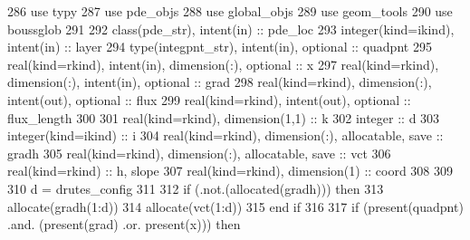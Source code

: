 \begin{DoxyCode}
286         \textcolor{keywordtype}{use }typy
287         \textcolor{keywordtype}{use }pde_objs
288         \textcolor{keywordtype}{use }global_objs
289         \textcolor{keywordtype}{use }geom_tools
290         \textcolor{keywordtype}{use }boussglob
291         
292         \textcolor{keywordtype}{class}(pde_str), \textcolor{keywordtype}{intent(in)} :: pde\_loc
293         \textcolor{keywordtype}{integer(kind=ikind)}, \textcolor{keywordtype}{intent(in)}                          :: layer
294         \textcolor{keywordtype}{type}(integpnt_str), \textcolor{keywordtype}{intent(in)}, \textcolor{keywordtype}{optional} :: quadpnt    
295         \textcolor{keywordtype}{real(kind=rkind)}, \textcolor{keywordtype}{intent(in)}, \textcolor{keywordtype}{dimension(:)}, \textcolor{keywordtype}{optional}                   :: x
297         \textcolor{keywordtype}{real(kind=rkind)}, \textcolor{keywordtype}{dimension(:)}, \textcolor{keywordtype}{intent(in)}, \textcolor{keywordtype}{optional}     :: grad
298         \textcolor{keywordtype}{real(kind=rkind)}, \textcolor{keywordtype}{dimension(:)}, \textcolor{keywordtype}{intent(out)}, \textcolor{keywordtype}{optional}    :: flux
299         \textcolor{keywordtype}{real(kind=rkind)}, \textcolor{keywordtype}{intent(out)}, \textcolor{keywordtype}{optional}                  :: flux\_length
300 
301         \textcolor{keywordtype}{real(kind=rkind)}, \textcolor{keywordtype}{dimension(1,1)}  :: k
302         \textcolor{keywordtype}{integer}                           :: d
303         \textcolor{keywordtype}{integer(kind=ikind)}               :: i
304         \textcolor{keywordtype}{real(kind=rkind)}, \textcolor{keywordtype}{dimension(:)}, \textcolor{keywordtype}{allocatable}, \textcolor{keywordtype}{save}  :: gradh
305         \textcolor{keywordtype}{real(kind=rkind)}, \textcolor{keywordtype}{dimension(:)}, \textcolor{keywordtype}{allocatable}, \textcolor{keywordtype}{save}  :: vct
306         \textcolor{keywordtype}{real(kind=rkind)} :: h, slope
307         \textcolor{keywordtype}{real(kind=rkind)}, \textcolor{keywordtype}{dimension(1)} :: coord
308         
309 
310         d = drutes_config%
311           
312         \textcolor{keywordflow}{if} (.not.(\textcolor{keyword}{allocated}(gradh))) \textcolor{keywordflow}{then}
313           \textcolor{keyword}{allocate}(gradh(1:d))
314           \textcolor{keyword}{allocate}(vct(1:d))
315 \textcolor{keywordflow}{        end if}
316 
317         \textcolor{keywordflow}{if} (\textcolor{keyword}{present}(quadpnt) .and. (\textcolor{keyword}{present}(grad) .or. \textcolor{keyword}{present}(x))) \textcolor{keywordflow}{then}

\end{DoxyCode}
